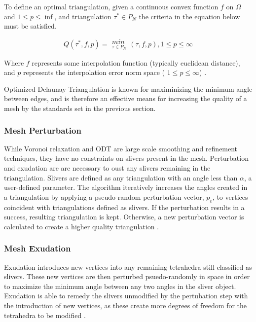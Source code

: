 \documentclass[12pt]{drexelthesis}
\let\Oldsubsubsection\subsubsection
\renewcommand{\subsubsection}{\FloatBarrier\Oldsubsubsection}
\begin{document}
To define an optimal triangulation, given a continuous convex function $f$ on $\Omega$ and $1 \leq p \leq \inf$, and triangulation $\tau^{\ast} \in P_{N}$  the criteria in the equation below must be satisfied.

\begin{equation}
	Q ( \tau^{\ast}  , f, p) = \substack{min \\ _{\tau \in P_{N}} } (\tau , f, p), 1 \leq p \leq \infty
\end{equation}

Where $f$ represents some interpolation function (typically euclidean distance), and $p$ represents the interpolation error norm space ( $1 \leq p \leq \infty$) \cite{ODT}.

Optimized Delaunay Triangulation is known for maximinizing the minimum angle between edges, and is therefore an effective means for increasing the quality of a mesh by the standards set in the previous section.

\subsubsection{Mesh Perturbation}
While  Voronoi  relaxation  and  ODT  are  large  scale  smoothing  and  refinement  techniques,  they  have  no  constraints  on  slivers  present  in  the  mesh.  Perturbation  and  exudation  are  are  necessary  to  oust  any  slivers  remaining  in  the  triangulation.  Slivers  are  defined  as  any  triangulation  with  an  angle  less  than  $\alpha$,  a  user-defined  parameter.  The  algorithm  iteratively  increases  the  angles  created  in  a  triangulation  by  applying  a  pseudo-random  perturbation  vector,  $p_{v}$,  to  vertices  coincident  with  triangulations  defined  as  slivers.  If  the  perturbation  results  in  a  success,  resulting  triangulation  is  kept.  Otherwise,  a  new  perturbation  vector  is  calculated  to  create  a  higher  quality  triangulation  \cite{RN63}. 

\subsubsection{Mesh Exudation}

Exudation introduces new vertices into any remaining tetrahedra still classified as slivers. These new vertices are then perturbed psuedo-randomly in space in order to maximize the minimum angle between any two angles in the sliver object. Exudation is able to remedy the slivers unmodified by the pertubation step with the introduction of new vertices, as these create more degrees of freedom for the tetrahedra to be modified \cite{RN64}.
\end{document}
